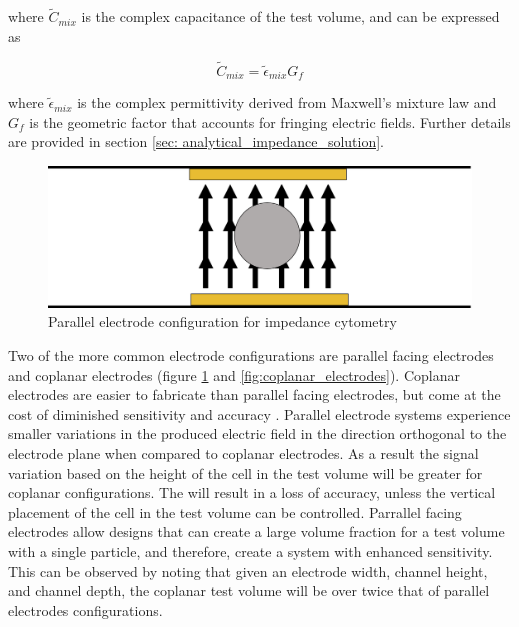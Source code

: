  \noindent where $\tilde{C}_{mix}$ is the complex capacitance of the test volume, and can be expressed as
 
 \begin{equation}
     \tilde{C}_{mix} = \tilde{\epsilon}_{mix}G_f
 \end{equation}
 
 \noindent where $\tilde{\epsilon}_{mix}$ is the complex permittivity derived from Maxwell's mixture law and $G_f$ is the geometric factor that accounts for fringing electric fields. Further details are provided in section \ref{sec: analytical_impedance_solution}.
 
 \begin{figure}[ht]
     \centering
     \includegraphics[width=\textwidth]{images/parallel.png}
     \caption{Parallel electrode configuration for impedance cytometry}
     \label{fig:parallel_electrodes}
 \end{figure}
 
 \par Two of the more common electrode configurations are parallel facing electrodes and coplanar electrodes (figure \ref{fig:parallel_electrodes} and \ref{fig:coplanar_electrodes}). Coplanar electrodes are easier to fabricate than parallel facing electrodes, but come at the cost of diminished sensitivity and accuracy \cite{sun_analytical_2007}. Parallel electrode systems experience smaller variations in the produced electric field in the direction orthogonal to the electrode plane when compared to coplanar electrodes. As a result the signal variation based on the height of the cell in the test volume will be greater for coplanar configurations. The will result in a loss of accuracy, unless the vertical placement of the cell in the test volume can be controlled. Parrallel facing electrodes allow designs that can create a large volume fraction for a test volume with a single particle, and therefore, create a system with enhanced sensitivity. This can be observed by noting that given an electrode width, channel height, and channel depth, the coplanar test volume will be over twice that of parallel electrodes configurations.
  
